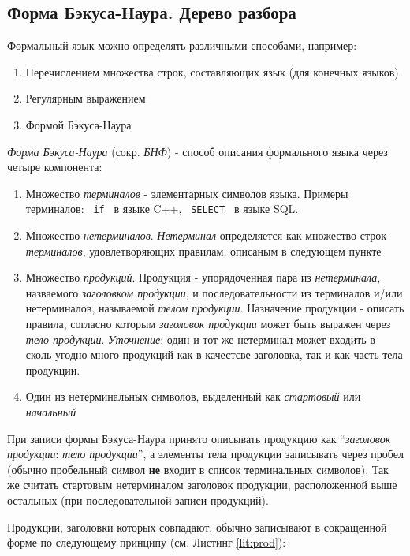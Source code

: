 \subsection{Форма Бэкуса-Наура. Дерево разбора} \label{lit:bnf}

Формальный язык можно определять различными способами, например:
\begin{enumerate}
    \item Перечислением множества строк, составляющих язык (для конечных языков)
    \item Регулярным выражением
    \item Формой Бэкуса-Наура
\end{enumerate}

\textit{Форма Бэкуса-Наура} (сокр. \textit{БНФ}) - способ описания формального языка через четыре компонента:
\begin{enumerate}
    \item Множество \textit{терминалов} - элементарных символов языка. Примеры терминалов: \texttt{ if } в языке C++, \texttt{ SELECT } в языке SQL.
    \item Множество \textit{нетерминалов}. \textit{Нетерминал} определяется как множество строк \textit{терминалов}, удовлетворяющих правилам, описаным в следующем пункте
    \item Множество \textit{продукций}. Продукция - упорядоченная пара из \textit{нетерминала}, назваемого \textit{заголовком продукции}, и последовательности из терминалов и/или нетерминалов, называемой \textit{телом продукции}. Назначение продукции - описать правила, согласно которым \textit{заголовок продукции} может быть выражен через \textit{тело продукции}. \textit{Уточнение}: один и тот же нетерминал может входить в сколь угодно много продукций как в качестсве заголовка, так и как часть тела продукции.
    \item Один из нетерминальных символов, выделенный как \textit{стартовый} или \textit{начальный}
\end{enumerate}

При записи формы Бэкуса-Наура принято описывать продукцию как \enquote{\textit{заголовок продукции}: \textit{тело продукции}}, а элементы тела продукции записывать через пробел (обычно пробельный символ \textbf{не} входит в список терминальных символов). Так же считать стартовым нетерминалом заголовок продукции, расположенной выше остальных (при последовательной записи продукций).

Продукции, заголовки которых совпадают, обычно записывают в сокращенной форме по следующему принципу (см. Листинг \ref{lit:prod}):

